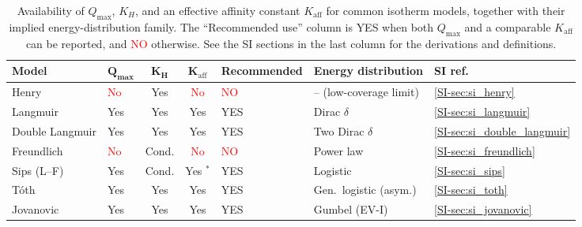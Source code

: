 \documentclass[journal=jacsat,manuscript=article]{achemso}
\begin{document}
	\begin{table}[H]
		\small
		\caption{Availability of $Q_{\max}$, $K_H$, and an effective affinity constant $K_{\mathrm{aff}}$ for common isotherm models, together with their implied energy-distribution family. The ``Recommended use'' column is \textcolor{green!50!black}{YES} when both $Q_{\max}$ and a comparable $K_{\mathrm{aff}}$ can be reported, and \textcolor{red}{NO} otherwise. See the SI sections in the last column for the derivations and definitions.}
		\label{tab:isotherm_availability}
		\renewcommand{\arraystretch}{1.2}
		\begin{tabular}{@{} p{2.0cm} p{1.0cm} c c p{3.0cm} p{3.8cm} p{1.8cm} @{}}
			\hline
			\textbf{Model}
			& $\boldsymbol{Q_{\max}}$
			& $\boldsymbol{K_H}$
			& $\boldsymbol{K_{\mathrm{aff}}}$
			& \textbf{Recommended}
			& \textbf{Energy distribution}
			& \textbf{SI ref.} \\
			\hline
			Henry
			& \textcolor{red}{No} & \textcolor{green!50!black}{Yes} & \textcolor{red}{No}
			& \textcolor{red}{NO}
			& -- (low-coverage limit)
			& \ref{SI-sec:si_henry} \\
			Langmuir
			& \textcolor{green!50!black}{Yes} & \textcolor{green!50!black}{Yes} & \textcolor{green!50!black}{Yes}
			& \textcolor{green!50!black}{YES}
			& Dirac $\delta$
			& \ref{SI-sec:si_langmuir} \\
			Double Langmuir
			& \textcolor{green!50!black}{Yes} & \textcolor{green!50!black}{Yes} & \textcolor{green!50!black}{Yes}
			& \textcolor{green!50!black}{YES}
			& Two Dirac $\delta$
			& \ref{SI-sec:si_double_langmuir} \\
			Freundlich
			& \textcolor{red}{No} & \textcolor{orange!80!black}{Cond.} & \textcolor{red}{No}
			& \textcolor{red}{NO}
			& Power law %
			& \ref{SI-sec:si_freundlich} \\
			Sips (L--F)
			& \textcolor{green!50!black}{Yes} & \textcolor{orange!80!black}{Cond.} & \textcolor{green!50!black}{Yes} $^*$
			& \textcolor{green!50!black}{YES}
			& Logistic
			& \ref{SI-sec:si_sips} \\
			T\'{o}th
			& \textcolor{green!50!black}{Yes} & \textcolor{green!50!black}{Yes} & \textcolor{green!50!black}{Yes}
			& \textcolor{green!50!black}{YES}
			& Gen.\ logistic (asym.)
			& \ref{SI-sec:si_toth} \\
			Jovanovic
			& \textcolor{green!50!black}{Yes} & \textcolor{green!50!black}{Yes} & \textcolor{green!50!black}{Yes}
			& \textcolor{green!50!black}{YES}
			& Gumbel (EV-I)
			& \ref{SI-sec:si_jovanovic} \\

\end{tabular}
\end{table}
\end{document}
